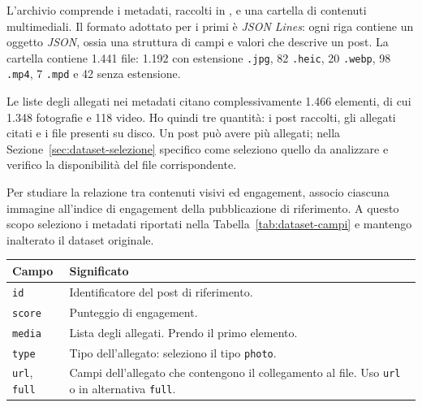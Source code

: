 L'archivio comprende i metadati, raccolti in , e una cartella di contenuti multimediali. Il formato adottato per i primi è \emph{JSON Lines}: ogni riga contiene un oggetto \emph{JSON}, ossia una struttura di campi e valori che descrive un post. La cartella  contiene 1.441 file: 1.192 con estensione \texttt{.jpg}, 82 \texttt{.heic}, 20 \texttt{.webp}, 98 \texttt{.mp4}, 7 \texttt{.mpd} e 42 senza estensione.

Le liste degli allegati nei metadati citano complessivamente 1.466 elementi, di cui 1.348 fotografie e 118 video. Ho quindi tre quantità: i post raccolti, gli allegati citati e i file presenti su disco. Un post può avere più allegati; nella Sezione~\ref{sec:dataset-selezione} specifico come seleziono quello da analizzare e verifico la disponibilità del file corrispondente.

Per studiare la relazione tra contenuti visivi ed engagement, associo ciascuna immagine all’indice di engagement della pubblicazione di riferimento. A questo scopo seleziono i metadati riportati nella Tabella~\ref{tab:dataset-campi} e mantengo inalterato il dataset originale.

\bigskip\noindent
\begin{minipage}{\linewidth}
    \centering
    \captionsetup{type=table}
    \caption{Campi utilizzati per associare un post alla sua immagine e al risultato di engagement. I campi \texttt{type}, \texttt{url} e \texttt{full} appartengono all'allegato selezionato nella lista \texttt{media}~\cite{DVN/SCCQYD_2019}.}
    \label{tab:dataset-campi}
    \begin{tabular}{@{}lp{}@{}}
        \toprule
        Campo & Significato \\
        \midrule
        \texttt{id} & Identificatore del post di riferimento. \\
        \texttt{score} & Punteggio di engagement. \\
        \texttt{media} & Lista degli allegati. Prendo il primo elemento. \\
        \texttt{type} & Tipo dell'allegato: seleziono il tipo \texttt{photo}. \\
        \texttt{url}, \texttt{full} & Campi dell'allegato che contengono il collegamento al file. Uso \texttt{url} o in alternativa \texttt{full}. \\
        \bottomrule
    \end{tabular}
\end{minipage}
\bigskip

